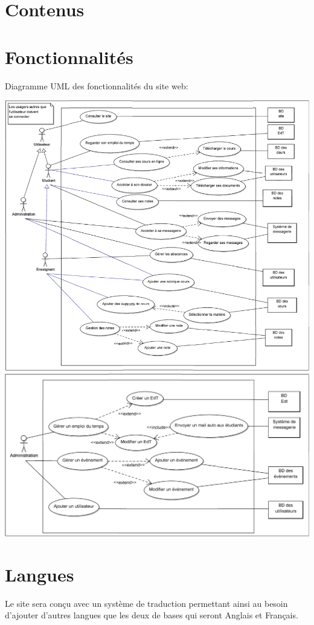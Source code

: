 \documentclass[oneside]{report}
\begin{document}
{		\section{Contenus}
		\section{Fonctionnalités}
		{
			\par Diagramme UML des fonctionnalités du site web:\\
			\begin{center}
				\includegraphics[scale=1.5]{uml_base}
				\\
				\includegraphics[scale=1.5]{uml_admin}
			\end{center}
		}
		\section{Langues}
		{
			\par Le site sera conçu avec un système de traduction permettant ainsi au besoin d'ajouter d'autres langues que les deux de bases qui seront Anglais et Français.
		}
	}
\end{document}

